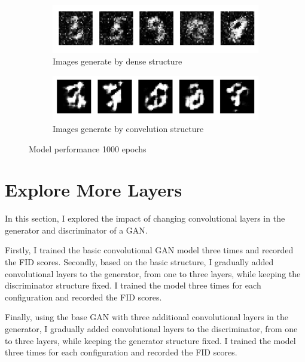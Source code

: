 \begin{figure}[H]
    \centering
    \begin{subfigure}[b]{\linewidth}
        \centering
        \includegraphics[width=0.7\linewidth]{./Images/generate_image_by_dense_layer.jpg}
        \caption{Images generate by dense structure}
        \label{fig:Dense}
    \end{subfigure}
    \vspace{0.05\linewidth} 
    \begin{subfigure}[b]{\linewidth}
        \centering
        \includegraphics[width=0.7\linewidth]{./Images/generate_image_by_Convelution_layer.jpg}
        \caption{Images generate by convelution structure}
        \label{fig:Conv2DTranspose}
    \end{subfigure}
    \caption{Model performance 1000 epochs}
    \label{fig:combined}
\end{figure}


\section*{Explore More Layers}

In this section, I explored the impact of changing convolutional layers in the generator and discriminator of a GAN.

Firstly, I trained the basic convolutional GAN model three times and recorded the FID scores. Secondly, based on the basic structure, I gradually added convolutional layers to the generator, from one to three layers, while keeping the discriminator structure fixed. I trained the model three times for each configuration and recorded the FID scores.

Finally, using the base GAN with three additional convolutional layers in the generator, I gradually added convolutional layers to the discriminator, from one to three layers, while keeping the generator structure fixed. I trained the model three times for each configuration and recorded the FID scores.

